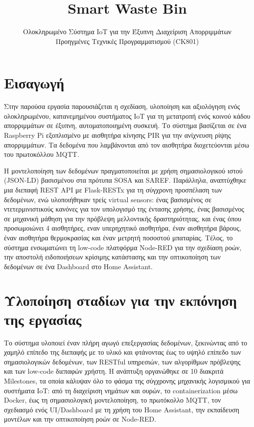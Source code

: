 \documentclass[acmsmall,screen,nonacm]{acmart}
\title{Smart Waste Bin}
\subtitle{Ολοκληρωμένο Σύστημα IoT για την Έξυπνη Διαχείριση Απορριμμάτων \\ Προηγμένες Τεχνικές Προγραμματισμού (CK801)}
\author{\NoCaseChange{Αθανάσιος Μήτσης 1100944 \& Βασίλειος Ρούσσης 1104685 \& Δημήτριος Φιλόπουλος 1101130}}
\affiliation{
	\institution{\newline Τμήμα ΗΜ\&ΤΥ, Πανεπιστήμιο Πατρών}
	\country{Ελλάδα\\\\\\\\\\}
}
\begin{document}
	
	\maketitle
	
	\tableofcontents
	
	\section{Εισαγωγή}
	
	Στην παρούσα εργασία παρουσιάζεται η σχεδίαση, υλοποίηση και αξιολόγηση ενός ολοκληρωμένου, κατανεμημένου συστήματος IoT για τη μετατροπή ενός κοινού κάδου απορριμμάτων σε έξυπνη, αυτοματοποιημένη συσκευή. Το σύστημα βασίζεται σε ένα Raspberry Pi εξοπλισμένο με αισθητήρα κίνησης PIR για την ανίχνευση ρίψης απορριμμάτων. Τα δεδομένα που λαμβάνονται από τον αισθητήρα διοχετεύονται μέσω του πρωτοκόλλου MQTT. 

	Η μοντελοποίηση των δεδομένων πραγματοποιείται με χρήση σημασιολογικού ιστού (JSON-LD) βασισμένου στα πρότυπα SOSA και SAREF. Παράλληλα, αναπτύχθηκε μια διεπαφή REST API με Flask-RESTx για τη σύγχρονη προσπέλαση των δεδομένων, ενώ υλοποιήθηκαν τρείς virtual sensors: ένας βασισμένος σε ντετερμινιστικούς κανόνες για τον υπολογισμό της έντασης χρήσης, ένας βασισμένος σε μηχανική μάθηση για την πρόβλεψη μελλοντικής δραστηριότητας, και ένας όπου προσωμοιώνει 4 αισθητήρες, εναν υπερηχητικό αισθητήρα, έναν αισθητήρα βάρους, έναν αισθητήρα θερμοκρασίας και έναν μετρητή ποσοστού μπαταρίας. Τέλος, το σύστημα ενσωματώνει τη low-code πλατφόρμα Node-RED για την σχεδίαση ροών, την αποστολή ειδοποιήσεων κρίσιμης κατάστασης και την οπτικοποίηση των δεδομένων σε ένα Dashboard στο Home Assistant.

	\section{Υλοποίηση σταδίων για την εκπόνηση της εργασίας}

	Το σύστημα υλοποιεί έναν πλήρη αγωγό επεξεργασίας δεδομένων, ξεκινώντας από το χαμηλό επίπεδο της διεπαφής με το υλικό και φτάνοντας έως το υψηλό επίπεδο των σημασιολογικών δεδομένων, των RESTful υπηρεσιών, των αλγορίθμων πρόβλεψης και των low-code διεπαφών χρήστη. Η ανάπτυξη οργανώθηκε σε 10 διακριτά Milestones, τα οποία κάλυψαν όλο το φάσμα της σύγχρονης μηχανικής λογισμικού για συστήματα IoT: από τη διαχείριση νημάτων και ουρών, το containerization μέσω Docker, έως τη σημασιολογική μοντελοποίηση, το πρωτόκολλο MQTT, τον σχεδιασμό ενός UI/Dashboard με τη χρήση του Home Assistant, την εκπαίδευση μοντέλων και την οπτικοποίηση ροών σε Node-RED.
	
\end{document}
